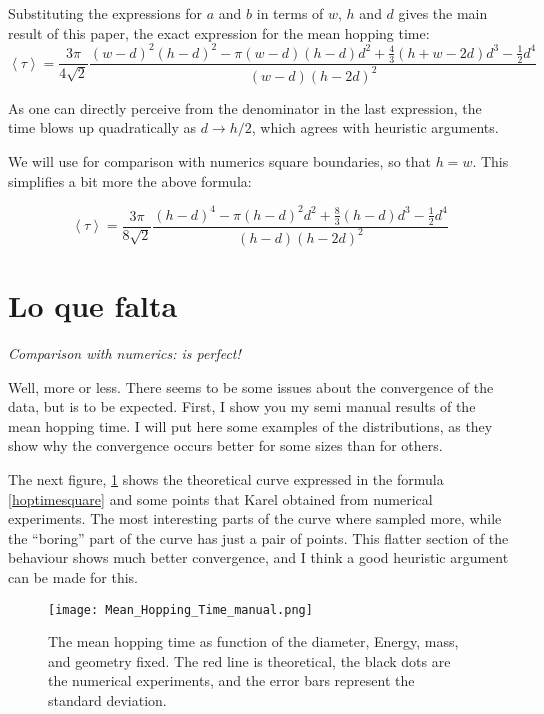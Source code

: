 \documentclass[letterpaper,10pt]{article}
\newcommand{\mean}[1]{\left \langle #1 \right \rangle}
\begin{document}
Substituting the expressions for $a$ and $b$ in terms of $w$, $h$ and $d$ gives
the main result of this paper, the exact expression for the mean hopping time:
\begin{equation}\label{hoptimegeneral}
 \mean{\tau} = \frac{3 \pi}{4 \sqrt{2}}
\frac{(w-d)^2(h-d)^2-\pi(w-d)(h-d)d^2+\frac{4}{3}(h+w-2d)d^3-\frac{1}{2}d^4}
{(w-d)(h-2d)^2}
\end{equation}

As one can directly perceive from the denominator in the last expression, the
time blows up quadratically as $d\rightarrow h/2$, which agrees
with heuristic arguments. 

We will use for comparison with numerics square boundaries, 
so that $h=w$. This simplifies a bit more the above 
formula:

\begin{equation}\label{hoptimesquare}
 \mean{\tau} =\frac{3\pi}{8\sqrt{2}} 
\frac{(h-d)^4-\pi(h-d)^2d^2+\frac{8}{3}(h-d)d^3-\frac{1}{2}d^4}
{(h-d)(h-2d)^2}
\end{equation}



\section{Lo que falta}

\emph{Comparison with numerics: is perfect!}

Well, more or less. There seems to be some issues about the convergence of the
data, but is to be expected. First, I show you my semi manual results of
the mean hopping time. I will put here some examples of the
distributions, as they show why the convergence occurs better for some
sizes than for others.

The next figure, \ref{MeanHopp01} shows the theoretical curve 
expressed in the formula \ref{hoptimesquare} and some points
that Karel obtained from numerical experiments. The most interesting
parts of the curve where sampled more, while the ``boring'' part
of the curve has just a pair of points. This flatter section of
the behaviour shows much better convergence, and I think a
good heuristic argument can be made for this.

\begin{figure}[h]
  \centering
  \texttt{[image: Mean\_Hopping\_Time\_manual.png]}
  \caption{The mean hopping time as function of the diameter, Energy, mass, and geometry fixed.
The red line is theoretical, the black dots are the numerical experiments, and the error bars
represent the standard deviation.}\label{MeanHopp01}
\end{figure}
\end{document}
